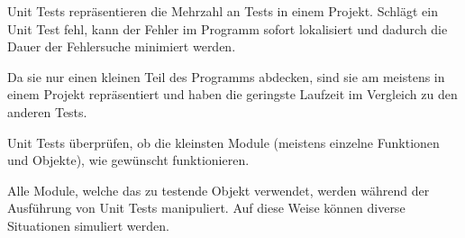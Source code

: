 Unit Tests repräsentieren die Mehrzahl an Tests in einem Projekt. Schlägt ein Unit Test fehl, 
kann der Fehler im Programm sofort lokalisiert und dadurch die Dauer der Fehlersuche minimiert werden.

Da sie nur einen kleinen Teil des Programms abdecken, 
sind sie am meistens in einem Projekt repräsentiert und haben die geringste Laufzeit im Vergleich zu den anderen Tests.

Unit Tests überprüfen, ob die kleinsten Module (meistens einzelne Funktionen und Objekte), 
wie gewünscht funktionieren. 

Alle Module, welche das zu testende Objekt verwendet, werden während der Ausführung von Unit Tests manipuliert.
Auf diese Weise können diverse Situationen simuliert werden.